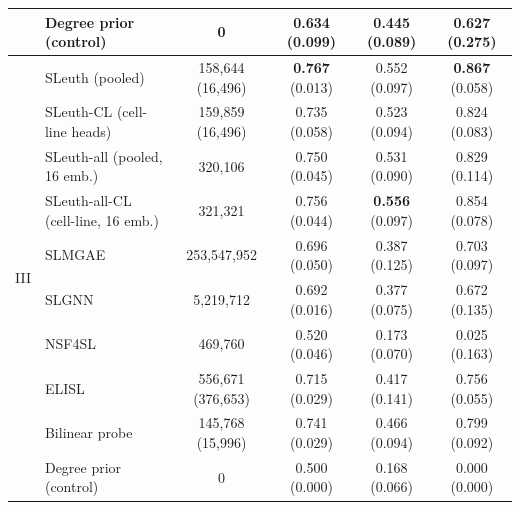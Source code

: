 \begin{tabular}{ll|cccc}
 & Degree prior (control) & 0 & 0.634 (0.099) & 0.445 (0.089) & 0.627 (0.275) \\
\hline
\multirow{10}{*}{III} & SLeuth (pooled) & 158{,}644 (16{,}496) & \textbf{0.767} (0.013) & 0.552 (0.097) & \textbf{0.867} (0.058) \\
 & SLeuth-CL (cell-line heads) & 159{,}859 (16{,}496) & 0.735 (0.058) & 0.523 (0.094) & 0.824 (0.083) \\
 & SLeuth-all (pooled, 16 emb.) & 320{,}106 & 0.750 (0.045) & 0.531 (0.090) & 0.829 (0.114) \\
 & SLeuth-all-CL (cell-line, 16 emb.) & 321{,}321 & 0.756 (0.044) & \textbf{0.556} (0.097) & 0.854 (0.078) \\
 & SLMGAE & 253{,}547{,}952 & 0.696 (0.050) & 0.387 (0.125) & 0.703 (0.097) \\
 & SLGNN & 5{,}219{,}712 & 0.692 (0.016) & 0.377 (0.075) & 0.672 (0.135) \\
 & NSF4SL & 469{,}760 & 0.520 (0.046) & 0.173 (0.070) & 0.025 (0.163) \\
 & ELISL & 556{,}671 (376{,}653) & 0.715 (0.029) & 0.417 (0.141) & 0.756 (0.055) \\
 & Bilinear probe & 145{,}768 (15{,}996) & 0.741 (0.029) & 0.466 (0.094) & 0.799 (0.092) \\
 & Degree prior (control) & 0 & 0.500 (0.000) & 0.168 (0.066) & 0.000 (0.000) \\
\hline
\end{tabular}

